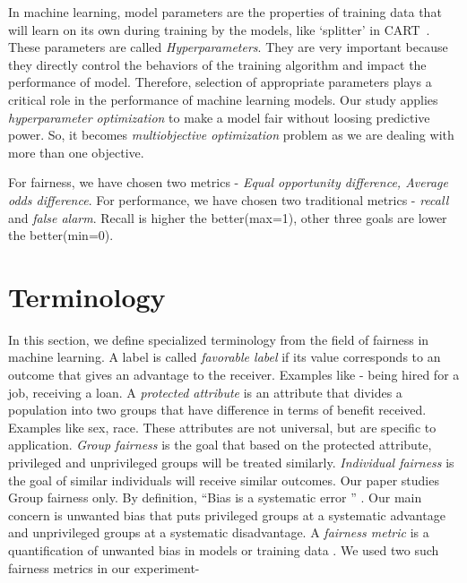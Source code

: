 \documentclass[10pt,conference]{IEEEtran}
\begin{document}
 In machine learning, model parameters are the properties of training data that will learn on its own during training by the models, like `splitter' in CART~\cite{breiman2017classification}. These parameters are called \textit{Hyperparameters}. They are very important because they directly control the behaviors of the training algorithm and impact the performance of model. Therefore, selection of appropriate parameters plays a critical role in the performance of machine learning models. Our study applies \textit{hyperparameter optimization} to make a model fair without loosing predictive power. So, it becomes \textit{multiobjective optimization} problem as we are dealing with more than one objective. 
 
 For fairness, we have chosen two metrics - \textit{Equal opportunity difference, Average odds difference}. For performance, we have chosen two traditional metrics - \textit{recall} and \textit{false alarm}. Recall is higher the better(max=1), other three goals are lower the better(min=0).


\section{Terminology}

In this section, we define specialized terminology from the field of fairness in machine learning. A label is called \textit{favorable label} if its  value corresponds to an outcome that gives an advantage to the receiver. Examples like - being hired for a job, receiving a loan. A \textit{protected attribute} is an attribute that divides a population into two groups that have difference in terms of benefit received. Examples like sex, race. These attributes are not universal, but are specific to application. \textit{Group fairness} is the goal that based on the protected attribute, privileged and unprivileged groups will be treated similarly. \textit{Individual fairness} is the goal of similar individuals will receive similar outcomes.  Our paper studies Group fairness only.
By definition, ``Bias is a systematic error '' \cite{bias_systemetic}. Our main concern is unwanted bias that puts privileged groups at a systematic advantage and unprivileged groups at a systematic disadvantage. A \textit{fairness metric} is a quantification of unwanted bias in models or training data \cite{IBM}. We used two such fairness metrics in our experiment-
\end{document}
